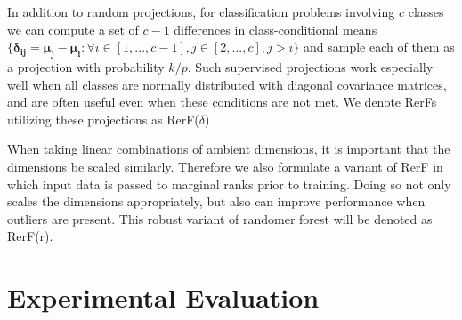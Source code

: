 \documentclass{article} %
\newcommand{\jovo}[1]{{\color{magenta}{\it jovo says: #1}}}
\begin{document}
\jovo{we need proper pseudocode table, make it sufficient general such that all the variants under consideration are special cases.}

In addition to random projections, for classification problems involving $c$ classes we can compute a set of $c-1$ differences in class-conditional means $\{\boldsymbol{\delta_{ij}} = \boldsymbol{\mu_j} - \boldsymbol{\mu_i}: \forall i \in [1,...,c-1], j \in [2,...,c], j>i\}$ and sample each of them as a projection with probability $k/p$. Such supervised projections work especially well when all classes are normally distributed with diagonal covariance matrices, and are often useful even when these conditions are not met. We denote RerFs utilizing these projections as RerF($\delta$)

When taking linear combinations of ambient dimensions, it is important that the dimensions be scaled similarly. Therefore we also formulate a variant of RerF in which input data is passed to marginal ranks prior to training. Doing so not only scales the dimensions appropriately, but also can improve performance when outliers are present. This robust variant of randomer forest will be denoted as RerF(r).

\section{Experimental Evaluation}
\end{document}
